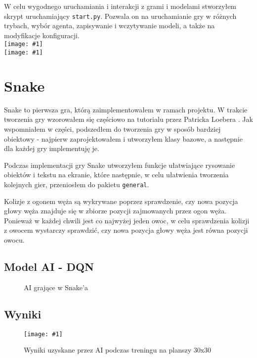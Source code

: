 \documentclass[12pt, draft]{report}
\newcommand{\img}[1]{\texttt{[image: \#1]}}
\begin{document}
W celu wygodnego uruchamiania i interakcji z grami i modelami stworzyłem skrypt uruchamiający \texttt{start.py}. Pozwala on na uruchamianie gry w różnych trybach, wybór agenta, zapisywanie i wczytywanie modeli, a także na modyfikacje konfiguracji.
\\
\img{start_main_help}
\\
\img{start_launch_help}

\chapter{Snake}

Snake to pierwsza gra, którą zaimplementowałem w ramach projektu. W trakcie tworzenia gry wzorowałem się częściowo na tutorialu przez Patricka Loebera \cite{SnakeTutorial}.
Jak wspomniałem w części, podszedłem do tworzenia gry w sposób bardziej obiektowy - najpierw zaprojektowałem i utworzyłem klasy bazowe, a następnie dla każdej gry implementuję je.

Podczas implementacji gry Snake utworzyłem funkcje ułatwiające rysowanie obiektów i tekstu na ekranie, które następnie, w celu ułatwienia tworzenia kolejnych gier, przeniosłem do pakietu \texttt{general}.

Kolizje z ogonem węża są wykrywane poprzez sprawdzenie, czy nowa pozycja głowy węża znajduje się w zbiorze pozycji zajmowanych przez ogon węża. \\
Ponieważ w każdej chwili jest co najwyżej jeden owoc, w celu sprawdzenia kolizji z owocem wystarczy sprawdzić, czy nowa pozycja głowy węża jest równa pozycji owocu.

\section{Model AI - DQN}


\begin{figure}
    \centering
    \caption{AI grające w Snake'a}
    \label{fig:snake_ai}
\end{figure}

\section{Wyniki}

\begin{figure}
    \centering
    \img{snake_score}
    \caption{Wyniki uzyskane przez AI podczas treningu na planszy 30x30}
\end{figure}
\end{document}
